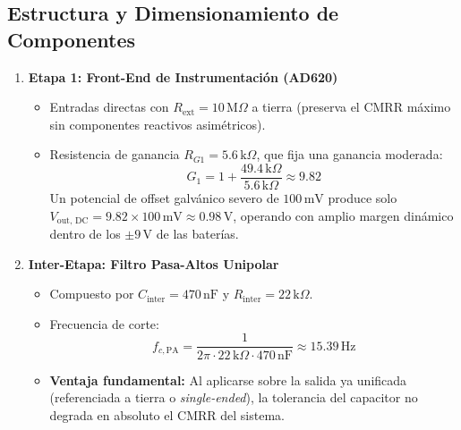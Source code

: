 \documentclass[11pt,a4paper]{article}
\begin{document}
\subsection{Estructura y Dimensionamiento de Componentes}
\begin{enumerate}
    \item \textbf{Etapa 1: Front-End de Instrumentación (AD620)}
    \begin{itemize}
        \item Entradas directas con $R_{\text{ext}} = 10\,\text{M}\Omega$ a tierra (preserva el CMRR máximo sin componentes reactivos asimétricos).
        \item Resistencia de ganancia $R_{G1} = 5.6\,\text{k}\Omega$, que fija una ganancia moderada:
        \begin{equation}
        G_1 = 1 + \frac{49.4\,\text{k}\Omega}{5.6\,\text{k}\Omega} \approx 9.82
        \end{equation}
        Un potencial de offset galvánico severo de $100\,\text{mV}$ produce solo $V_{\text{out, DC}} = 9.82 \times 100\,\text{mV} \approx 0.98\,\text{V}$, operando con amplio margen dinámico dentro de los $\pm 9\,\text{V}$ de las baterías.
    \end{itemize}

    \item \textbf{Inter-Etapa: Filtro Pasa-Altos Unipolar}
    \begin{itemize}
        \item Compuesto por $C_{\text{inter}} = 470\,\text{nF}$ y $R_{\text{inter}} = 22\,\text{k}\Omega$.
        \item Frecuencia de corte:
        \begin{equation}
        f_{c, \text{PA}} = \frac{1}{2\pi \cdot 22\,\text{k}\Omega \cdot 470\,\text{nF}} \approx 15.39\,\text{Hz}
        \end{equation}
        \item \textbf{Ventaja fundamental:} Al aplicarse sobre la salida ya unificada (referenciada a tierra o \textit{single-ended}), la tolerancia del capacitor no degrada en absoluto el CMRR del sistema.
    \end{itemize}


\end{enumerate}
\end{document}
